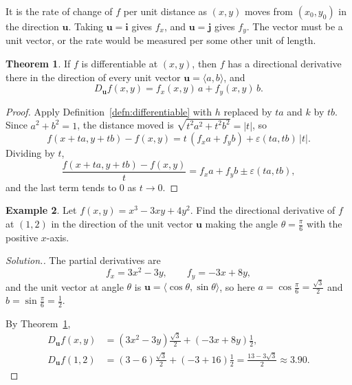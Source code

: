 \documentclass[11pt,a4paper]{article}
\theoremstyle{definition}
\newtheorem{thm}{Theorem}[subsection]
\newtheorem{exa}[thm]{Example}
\newenvironment{solution}
  {\renewcommand{\qedsymbol}{}\begin{proof}[\textit{Solution}.]}
  {\end{proof}}
\begin{document}
It is the rate of change of $f$ per unit distance as $(x,y)$ moves from
$(x_0,y_0)$ in the direction $\mathbf u$. Taking $\mathbf u = \mathbf i$ gives
$f_x$, and $\mathbf u = \mathbf j$ gives $f_y$. The vector must be a unit
vector, or the rate would be measured per some other unit of length.

\begin{thm}
\label{thm:directional}
If $f$ is differentiable at $(x,y)$, then $f$ has a directional derivative there
in the direction of every unit vector $\mathbf u = \langle a, b \rangle$, and
\[D_{\mathbf u}f(x,y) = f_x(x,y)\, a + f_y(x,y)\, b .\]
\end{thm}

\begin{proof}
Apply Definition~\ref{defn:differentiable} with $h$ replaced by $ta$ and $k$ by
$tb$. Since $a^2+b^2 = 1$, the distance moved is
$\sqrt{t^2a^2+t^2b^2} = |t|$, so
\[f(x+ta,y+tb) - f(x,y) = t\,(f_x a + f_y b) + \varepsilon(ta,tb)\,|t| .\]
Dividing by $t$,
\[\frac{f(x+ta,y+tb) - f(x,y)}{t} = f_x a + f_y b \pm \varepsilon(ta,tb),\]
and the last term tends to $0$ as $t\to 0$.
\end{proof}

\begin{exa}
\label{ex:dirangle}
Let $f(x,y) = x^3 -3xy + 4y^2$. Find the directional derivative of $f$ at $(1,2)$
in the direction of the unit vector $\mathbf u$ making the angle
$\theta = \frac{\pi}{6}$ with the positive $x$-axis.
\end{exa}

\begin{solution}
The partial derivatives are
\[f_x = 3x^2 -3y ,\qquad f_y = -3x + 8y ,\]
and the unit vector at angle $\theta$ is
$\mathbf u = \langle\cos\theta,\sin\theta\rangle$, so here
$a = \cos \frac{\pi}{6} = \frac{\sqrt 3}{2}$ and $b = \sin \frac{\pi}{6} = \frac12$.

\begin{figure}[H]
\centering
{}
\end{figure}

By Theorem~\ref{thm:directional},
\begin{align*}
D_{\mathbf u} f(x,y) & = (3x^2 - 3y) \frac{\sqrt3}{2} + (-3x + 8y) \frac{1}{2},\\
D_{\mathbf u} f(1,2) & = (3 - 6)\frac{\sqrt3}{2} + (-3 + 16)\frac12 =
\frac{13 - 3\sqrt{3}}{2}\approx 3.90 .
\end{align*}
\end{solution}
\end{document}
